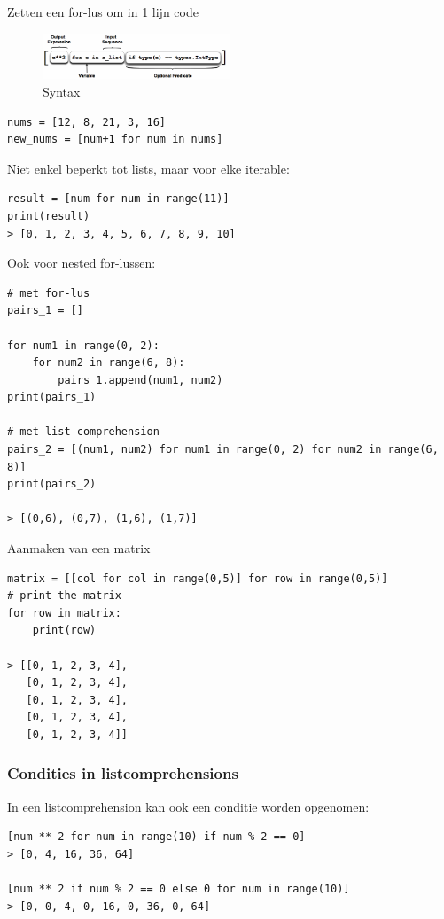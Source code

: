 \documentclass{article}
\begin{document}
Zetten een for-lus om in 1 lijn code

\begin{figure}[H]
    \centering
    \includegraphics[width=0.5\textwidth]{listcomprehension-syntax.png}
    \caption{Syntax}
\end{figure}

\begin{verbatim}
nums = [12, 8, 21, 3, 16]
new_nums = [num+1 for num in nums]
\end{verbatim}

Niet enkel beperkt tot lists, maar voor elke iterable:

\begin{verbatim}
result = [num for num in range(11)]
print(result)
> [0, 1, 2, 3, 4, 5, 6, 7, 8, 9, 10]
\end{verbatim}

Ook voor nested for-lussen:

\begin{verbatim}
# met for-lus
pairs_1 = []

for num1 in range(0, 2):
    for num2 in range(6, 8):
        pairs_1.append(num1, num2)
print(pairs_1)

# met list comprehension
pairs_2 = [(num1, num2) for num1 in range(0, 2) for num2 in range(6, 8)]
print(pairs_2)

> [(0,6), (0,7), (1,6), (1,7)]
\end{verbatim}

Aanmaken van een matrix

\begin{verbatim}
matrix = [[col for col in range(0,5)] for row in range(0,5)]
# print the matrix
for row in matrix:
    print(row)

> [[0, 1, 2, 3, 4],
   [0, 1, 2, 3, 4],
   [0, 1, 2, 3, 4],
   [0, 1, 2, 3, 4],
   [0, 1, 2, 3, 4]]
\end{verbatim}

\subsubsection{Condities in listcomprehensions}

In een listcomprehension kan ook een conditie worden opgenomen:

\begin{verbatim}
[num ** 2 for num in range(10) if num % 2 == 0]
> [0, 4, 16, 36, 64]

[num ** 2 if num % 2 == 0 else 0 for num in range(10)]
> [0, 0, 4, 0, 16, 0, 36, 0, 64]
\end{verbatim}
\end{document}
